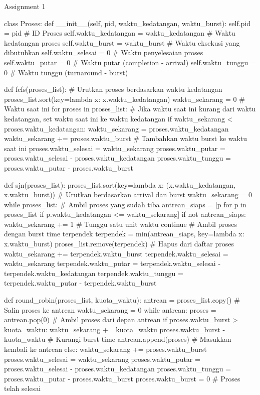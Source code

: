 \documentclass[12pt]{article}
\begin{document}
    
\begin{python}
Assignment 1 

class Proses:
    def __init__(self, pid, waktu_kedatangan, waktu_burst):
        self.pid = pid  # ID Proses
        self.waktu_kedatangan = waktu_kedatangan  # Waktu kedatangan proses
        self.waktu_burst = waktu_burst  # Waktu eksekusi yang dibutuhkan
        self.waktu_selesai = 0  # Waktu penyelesaian proses
        self.waktu_putar = 0  # Waktu putar (completion - arrival)
        self.waktu_tunggu = 0  # Waktu tunggu (turnaround - burst)

def fcfs(proses_list):
    # Urutkan proses berdasarkan waktu kedatangan
    proses_list.sort(key=lambda x: x.waktu_kedatangan)  
    waktu_sekarang = 0  # Waktu saat ini
    for proses in proses_list:
        # Jika waktu saat ini kurang dari waktu kedatangan, set waktu saat ini ke waktu kedatangan
        if waktu_sekarang < proses.waktu_kedatangan:
            waktu_sekarang = proses.waktu_kedatangan
        waktu_sekarang += proses.waktu_burst  # Tambahkan waktu burst ke waktu saat ini
        proses.waktu_selesai = waktu_sekarang
        proses.waktu_putar = proses.waktu_selesai - proses.waktu_kedatangan
        proses.waktu_tunggu = proses.waktu_putar - proses.waktu_burst

def sjn(proses_list):
    proses_list.sort(key=lambda x: (x.waktu_kedatangan, x.waktu_burst))  # Urutkan berdasarkan arrival dan burst
    waktu_sekarang = 0
    while proses_list:
        # Ambil proses yang sudah tiba
        antrean_siaps = [p for p in proses_list if p.waktu_kedatangan <= waktu_sekarang]
        if not antrean_siaps:
            waktu_sekarang += 1  # Tunggu satu unit waktu
            continue
        # Ambil proses dengan burst time terpendek
        terpendek = min(antrean_siaps, key=lambda x: x.waktu_burst)
        proses_list.remove(terpendek)  # Hapus dari daftar proses
        waktu_sekarang += terpendek.waktu_burst
        terpendek.waktu_selesai = waktu_sekarang
        terpendek.waktu_putar = terpendek.waktu_selesai - terpendek.waktu_kedatangan
        terpendek.waktu_tunggu = terpendek.waktu_putar - terpendek.waktu_burst

def round_robin(proses_list, kuota_waktu):
    antrean = proses_list.copy()  # Salin proses ke antrean
    waktu_sekarang = 0
    while antrean:
        proses = antrean.pop(0)  # Ambil proses dari depan antrean
        if proses.waktu_burst > kuota_waktu:
            waktu_sekarang += kuota_waktu
            proses.waktu_burst -= kuota_waktu  # Kurangi burst time
            antrean.append(proses)  # Masukkan kembali ke antrean
        else:
            waktu_sekarang += proses.waktu_burst
            proses.waktu_selesai = waktu_sekarang
            proses.waktu_putar = proses.waktu_selesai - proses.waktu_kedatangan
            proses.waktu_tunggu = proses.waktu_putar - proses.waktu_burst
            proses.waktu_burst = 0  # Proses telah selesai

\end{python}
\end{document}
